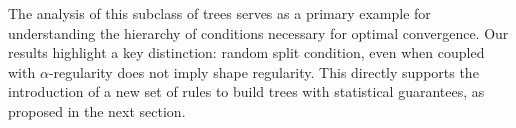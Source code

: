 \documentclass[paper=a4, fontsize=11pt]{scrartcl}
\begin{document}

The analysis of this subclass of trees serves as a primary example for understanding the hierarchy of conditions necessary for optimal convergence. 
Our results highlight a key distinction: random split condition, even when coupled with $\alpha$-regularity does not imply shape regularity. %
This directly supports the introduction of a new set of rules to build trees with statistical guarantees, as proposed in the next section.




\end{document}
